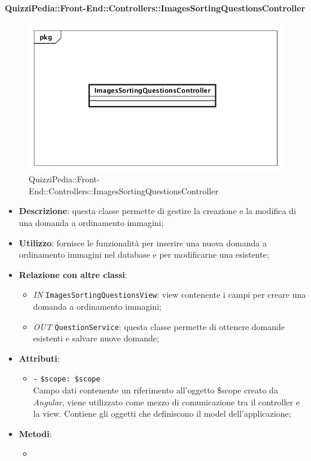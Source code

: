 \paragraph{QuizziPedia::Front-End::Controllers::ImagesSortingQuestionsController}
\begin{figure} [ht]
	\centering
	\includegraphics[scale=0.45]{UML/Classi/Front-End/QuizziPedia_Front-end_Controller_ImagesSortingQuestionsController.png}
	\caption{QuizziPedia::Front-End::Controllers::ImagesSortingQuestionsController}
\end{figure} \FloatBarrier
\begin{itemize}
	\item \textbf{Descrizione}: questa classe permette di gestire la creazione e la modifica di una domanda a ordinamento immagini;
	\item \textbf{Utilizzo}: fornisce le funzionalità per inserire una nuova domanda a ordinamento immagini nel database e per modificarne una esistente;
	\item \textbf{Relazione con altre classi}:
	\begin{itemize}
		\item \textit{IN} \texttt{ImagesSortingQuestionsView}: view contenente i campi per creare una domanda a ordinamento immagini; 
		\item \textit{OUT} \texttt{QuestionService}: questa classe permette di ottenere domande esistenti e salvare nuove domande;
	\end{itemize}
	\item \textbf{Attributi}:
	\begin{itemize}
		\item \texttt{-} \texttt{\$scope: \$scope} \\
		Campo dati contenente un riferimento all’oggetto \$scope creato da \textit{Angular}, viene utilizzato come mezzo di comunicazione tra il controller e la view. Contiene gli oggetti che definiscono il model dell’applicazione;
	\end{itemize}
	\item \textbf{Metodi}:
	\begin{itemize}
		\item 
	\end{itemize}
\end{itemize}

